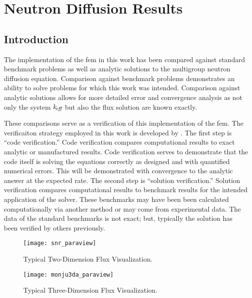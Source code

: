 \chapter{Neutron Diffusion Results}
\label{ch:diffusionResults}

\section{Introduction}
  The implementation of the \gls{fem} in this work has been compared
  against standard benchmark problems as well as analytic solutions to the
  multigroup neutron diffusion equation. Comparison against benchmark problems
  demonstrates an ability to solve problems for which this work was intended.
  Comparison against analytic solutions allows for more detailed error and
  convergence analysis as not only the system $k_{\!\mbox{\scriptsize \em eff}}$ but also the flux solution
  are known exactly. 

  These comparisons serve as a verification of this implementation of the
  \gls{fem}. The verificaiton strategy employed in this work is developed by
  \textcite{oberkampf}. The first step is ``code verification.'' Code
  verification compares computational results to exact analytic or manufactured
  results. Code verification serves to demonstrate that the code itself is
  solving the equations correctly as designed and with quantified numerical
  errors. This will be demonstrated with convergence to the analytic answer at
  the expected rate. The second step is ``solution verification.'' Solution
  verification compares computational results to benchmark results for the
  intended application of the solver. These benchmarks may have been been
  calculated computationally via another method or may come from experimental
  data. The data of the standard benchmarks is not exact; but, typically the
  solution has been verified by others previously.

  \begin{figure}
    \centering
    \texttt{[image: snr\_paraview]}
    \caption{Typical Two-Dimension Flux Visualization.}
    \label{fig:snr_paraview}
  \end{figure}

  \begin{figure}
    \centering
    \texttt{[image: monju3da\_paraview]}
    \caption{Typical Three-Dimension Flux Visualization.}
    \label{fig:monju3da_paraview}
  \end{figure}

